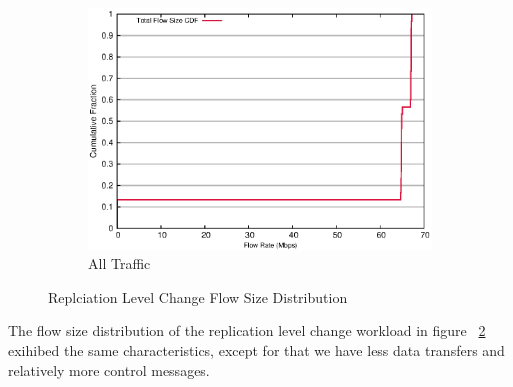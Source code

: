 \begin{figure}[!htpb]
\begin{subfigure}[b]{.55\linewidth}
	\includegraphics[width=.99\textwidth]{figures/replica_change/flow_size.eps}
	\caption{All Traffic}\label{fig:read_size:all}
   \end{subfigure}%
\caption{Replciation Level Change Flow Size Distribution}
\label{fig:replica_size}
\end{figure}

The flow size distribution of the replication level change workload in figure ~\ref{fig:replica_size} exihibed the same characteristics, except for that we have less data transfers and relatively more control messages. 


